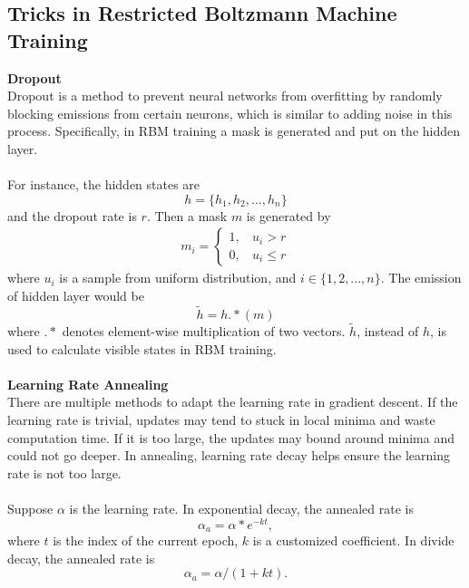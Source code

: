 \documentclass[12pt]{article}
\begin{document}
\subsection{Tricks in Restricted Boltzmann Machine Training}
\textbf{Dropout}\\
Dropout is a method to prevent neural networks from overfitting by randomly blocking emissions from certain neurons, which is similar to adding noise in this process. Specifically, in RBM training a mask is generated and put on the hidden layer.\\
\\
For instance, the hidden states are \begin{equation}
h = \{h_1, h_2, ..., h_n\}
\end{equation}
and the dropout rate is $r$. Then a mask $m$ is generated by 
\begin{eqnarray}
m_i=\begin{cases}
1,~~~~u_i > r\\
0,~~~~u_i \leq r
\end{cases}
\end{eqnarray}
where $u_i$ is a sample from uniform distribution, and $i\in \{1, 2, ..., n\}$. The emission of hidden layer would be \begin{equation}
\tilde{h} = h.*(m)
\end{equation}
where $.*$ denotes element-wise multiplication of two vectors. $\tilde{h}$, instead of $h$, is used to calculate visible states in RBM training.\\
\\
\textbf{Learning Rate Annealing}\\
There are multiple methods to adapt the learning rate in gradient descent. If the learning rate is trivial, updates may tend to stuck in local minima and waste computation time. If it is too large, the updates may bound around minima and could not go deeper. In annealing, learning rate decay helps ensure the learning rate is not too large.\\
\\
Suppose $\alpha$ is the learning rate. In exponential decay, the annealed rate is\begin{equation}
\alpha_a = \alpha * e^{-kt},
\end{equation}
where $t$ is the index of the current epoch, $k$ is a customized coefficient. In divide decay, the annealed rate is\begin{equation}
\alpha_a = \alpha / (1 + kt).
\end{equation}
\end{document}
